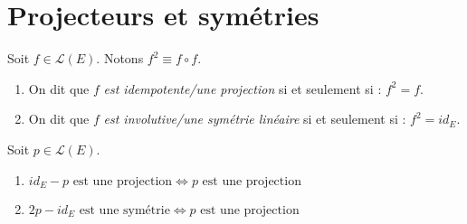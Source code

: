 \section{Projecteurs et symétries}
\begin{definition}
    Soit $f \in \mathcal{L}(E)$. Notons $f^2 \equiv f \circ f$.
    \begin{enumerate}
        \item On dit que $f$ \emph{est idempotente/une projection} si et seulement si : $f^2 = f$.
        \item On dit que $f$ \emph{est involutive/une symétrie linéaire} si et seulement si : $f^2 = id_E$.
    \end{enumerate}
\end{definition}

\begin{proposition} 
    Soit $p \in \mathcal{L}(E)$.
    \begin{enumerate}
        \item $id_E - p \text{ est une projection} \iff p \text{ est une projection}$
        \item $2p - id_E \text{ est une symétrie} \iff p \text{ est une projection}$
    \end{enumerate}
\end{proposition}

